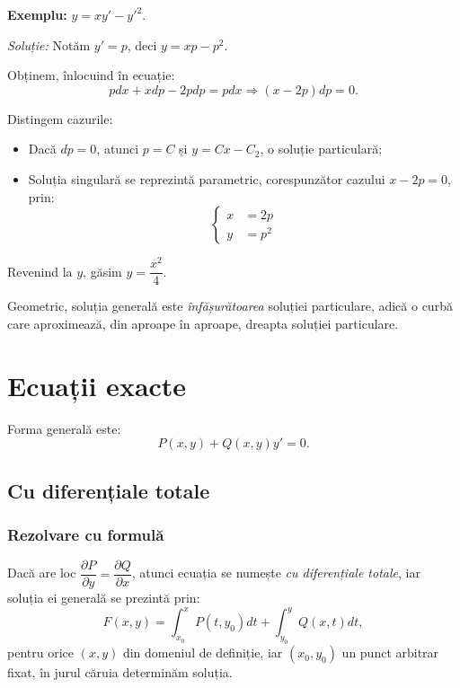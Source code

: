 \vspace{0.5cm}

\textbf{Exemplu:} $y = xy' - {y'}^2$.

\emph{Soluție:} Notăm $y' = p$, deci $y = xp - p^2$.

Obținem, înlocuind în ecuație:
\[
  pdx + xdp - 2pdp = pdx \Rightarrow (x - 2p) dp = 0.
\]

Distingem cazurile:
\begin{itemize}
\item Dacă $dp = 0$, atunci $p = C$ și $y = Cx - C_2$, o soluție particulară;
\item Soluția singulară se reprezintă parametric, corespunzător cazului $x - 2p = 0$, prin:
  \[
    \begin{cases}
      x &= 2p \\
      y &= p^2
    \end{cases}
  \]
\end{itemize}

Revenind la $y$, găsim $y = \dfrac{x^2}{4}$.

\begin{remark}\label{rk:infas}
  Geometric, soluția generală este \emph{înfășurătoarea} soluției particulare, adică o curbă
  care aproximează, din aproape în aproape, dreapta soluției particulare.
\end{remark}


\section{Ecuații exacte}
\label{sec:exc-int}

Forma generală este:
\[
  P(x, y) + Q(x, y) y' = 0.
\]

\subsection{Cu diferențiale totale}

\subsubsection{Rezolvare cu formulă}

Dacă are loc $\dfrac{\partial P}{\partial y} = \dfrac{\partial Q}{\partial x}$, atunci
ecuația se numește \emph{cu diferențiale totale}, iar soluția ei generală se prezintă prin:
\[
  F(x, y) = \int_{x_0}^x P(t, y_0) dt + \int_{y_0}^y Q(x, t) dt,
\]
pentru orice $(x, y)$ din domeniul de definiție, iar $(x_0, y_0)$ un punct arbitrar fixat,
în jurul căruia determinăm soluția.


